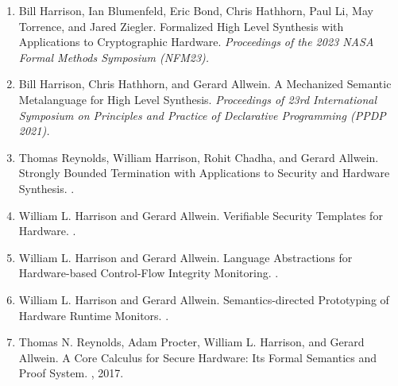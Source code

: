 \documentclass[12pt]{article} %
\begin{document}
\begin{enumerate}[leftmargin=0.0mm]

\item Bill Harrison, Ian Blumenfeld, Eric Bond, Chris Hathhorn, Paul Li, May Torrence, and Jared Ziegler.
\newblock Formalized High Level Synthesis with Applications to Cryptographic Hardware.
\newblock \emph{Proceedings of the 2023 NASA Formal Methods Symposium (NFM23).}

\item Bill Harrison, Chris Hathhorn, and Gerard Allwein.
\newblock A Mechanized Semantic Metalanguage for High Level Synthesis.  
\newblock \emph{Proceedings of 23rd International Symposium on Principles and Practice of Declarative Programming (PPDP 2021).}


\item
Thomas Reynolds, William Harrison, Rohit Chadha, and Gerard Allwein.
\newblock Strongly Bounded Termination with Applications to Security and Hardware Synthesis.
.

\item 
William L. Harrison and Gerard Allwein.
\newblock Verifiable Security Templates for Hardware.
. 

\item 
William L. Harrison and Gerard Allwein.
\newblock Language Abstractions for Hardware-based Control-Flow Integrity Monitoring.
.

\item 
William L. Harrison and Gerard Allwein.
\newblock Semantics-directed Prototyping of Hardware Runtime Monitors.
.

\item 
Thomas N. Reynolds, Adam Procter, William L. Harrison, and Gerard Allwein.
\newblock A Core Calculus for Secure Hardware: Its Formal Semantics and Proof System.
, 2017.



\end{enumerate}
\end{document}
